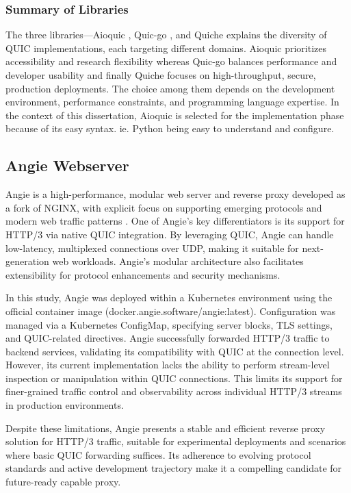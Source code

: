 \subsubsection{Summary of Libraries}
The three libraries—Aioquic \cite{aioquic-repo}, Quic-go \cite{quic-go-repo}, and Quiche \cite{quiche-repo} explains the diversity of QUIC implementations, each targeting different domains. Aioquic prioritizes accessibility and research flexibility whereas Quic-go balances performance and developer usability and finally Quiche focuses on high-throughput, secure, production deployments. The choice among them depends on the development environment, performance constraints, and programming language expertise. In the context of this dissertation, Aioquic is selected for the implementation phase because of its easy syntax.  ie. Python being easy to understand and configure.

\subsection{Angie Webserver}
Angie is a high-performance, modular web server and reverse proxy developed as a fork of NGINX, with explicit focus on supporting emerging protocols and modern web traffic patterns \cite{angie-docs}. One of Angie's key differentiators is its support for HTTP/3 via native QUIC integration. By leveraging QUIC, Angie can handle low-latency, multiplexed connections over UDP, making it suitable for next-generation web workloads. Angie's modular architecture also facilitates extensibility for protocol enhancements and security mechanisms.

In this study, Angie was deployed within a Kubernetes environment using the official container image (docker.angie.software/angie:latest). Configuration was managed via a Kubernetes ConfigMap, specifying server blocks, TLS settings, and QUIC-related directives. Angie successfully forwarded HTTP/3 traffic to backend services, validating its compatibility with QUIC at the connection level. However, its current implementation lacks the ability to perform stream-level inspection or manipulation within QUIC connections. This limits its support for finer-grained traffic control and observability across individual HTTP/3 streams in production environments.

Despite these limitations, Angie presents a stable and efficient reverse proxy solution for HTTP/3 traffic, suitable for experimental deployments and scenarios where basic QUIC forwarding suffices. Its adherence to evolving protocol standards and active development trajectory make it a compelling candidate for future-ready capable proxy.


